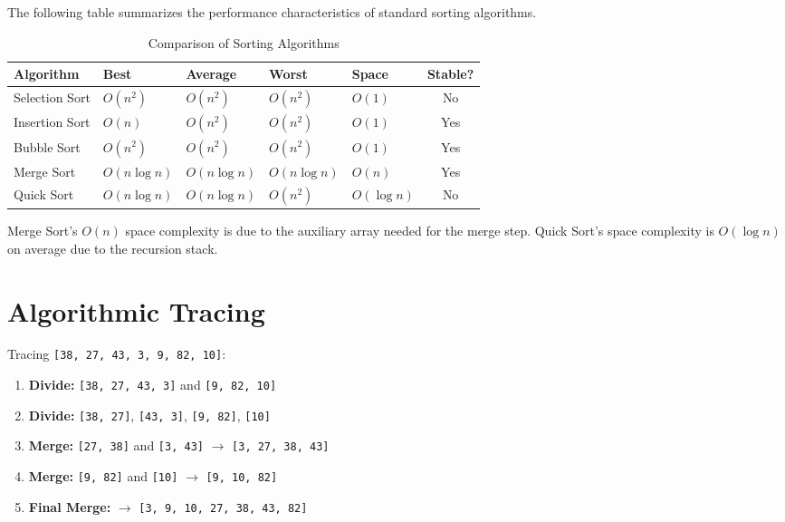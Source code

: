 \begin{theorem}
    The following table summarizes the performance characteristics of standard sorting algorithms.
\end{theorem}

\begin{table}[h]
\centering
\begin{tabular}{|l|l|l|l|l|c|}
\hline
\textbf{Algorithm} & \textbf{Best} & \textbf{Average} & \textbf{Worst} & \textbf{Space} & \textbf{Stable?} \\ \hline
Selection Sort & $O(n^2)$ & $O(n^2)$ & $O(n^2)$ & $O(1)$ & No \\ \hline
Insertion Sort & $O(n)$ & $O(n^2)$ & $O(n^2)$ & $O(1)$ & Yes \\ \hline
Bubble Sort & $O(n^2)$ & $O(n^2)$ & $O(n^2)$ & $O(1)$ & Yes \\ \hline
Merge Sort & $O(n \log n)$ & $O(n \log n)$ & $O(n \log n)$ & $O(n)$ & Yes \\ \hline
Quick Sort & $O(n \log n)$ & $O(n \log n)$ & $O(n^2)$ & $O(\log n)$ & No \\ \hline
\end{tabular}
\caption{Comparison of Sorting Algorithms}
\end{table}

\begin{remark}
    Merge Sort's $O(n)$ space complexity is due to the auxiliary array needed for the merge step. Quick Sort's space complexity is $O(\log n)$ on average due to the recursion stack.
\end{remark}

\section{Algorithmic Tracing}

\begin{example}
    Tracing \texttt{[38, 27, 43, 3, 9, 82, 10]}:
    \begin{enumerate}
        \item \textbf{Divide:} \texttt{[38, 27, 43, 3]} and \texttt{[9, 82, 10]}
        \item \textbf{Divide:} \texttt{[38, 27]}, \texttt{[43, 3]}, \texttt{[9, 82]}, \texttt{[10]}
        \item \textbf{Merge:} \texttt{[27, 38]} and \texttt{[3, 43]} $\rightarrow$ \texttt{[3, 27, 38, 43]}
        \item \textbf{Merge:} \texttt{[9, 82]} and \texttt{[10]} $\rightarrow$ \texttt{[9, 10, 82]}
        \item \textbf{Final Merge:} $\rightarrow$ \texttt{[3, 9, 10, 27, 38, 43, 82]}
    \end{enumerate}
\end{example}

